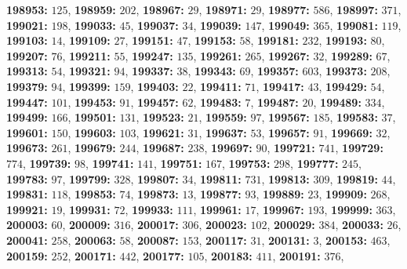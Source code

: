 \textsf{\bfseries 198953:} $125$, \textsf{\bfseries 198959:} $202$, \textsf{\bfseries 198967:} $29$, \textsf{\bfseries 198971:} $29$, \textsf{\bfseries 198977:} $586$, \textsf{\bfseries 198997:} $371$, \textsf{\bfseries 199021:} $198$, \textsf{\bfseries 199033:} $45$, \textsf{\bfseries 199037:} $34$, \textsf{\bfseries 199039:} $147$, \textsf{\bfseries 199049:} $365$, \textsf{\bfseries 199081:} $119$, \textsf{\bfseries 199103:} $14$, \textsf{\bfseries 199109:} $27$, \textsf{\bfseries 199151:} $47$, \textsf{\bfseries 199153:} $58$, \textsf{\bfseries 199181:} $232$, \textsf{\bfseries 199193:} $80$, \textsf{\bfseries 199207:} $76$, \textsf{\bfseries 199211:} $55$, \textsf{\bfseries 199247:} $135$, \textsf{\bfseries 199261:} $265$, \textsf{\bfseries 199267:} $32$, \textsf{\bfseries 199289:} $67$, \textsf{\bfseries 199313:} $54$, \textsf{\bfseries 199321:} $94$, \textsf{\bfseries 199337:} $38$, \textsf{\bfseries 199343:} $69$, \textsf{\bfseries 199357:} $603$, \textsf{\bfseries 199373:} $208$, \textsf{\bfseries 199379:} $94$, \textsf{\bfseries 199399:} $159$, \textsf{\bfseries 199403:} $22$, \textsf{\bfseries 199411:} $71$, \textsf{\bfseries 199417:} $43$, \textsf{\bfseries 199429:} $54$, \textsf{\bfseries 199447:} $101$, \textsf{\bfseries 199453:} $91$, \textsf{\bfseries 199457:} $62$, \textsf{\bfseries 199483:} $7$, \textsf{\bfseries 199487:} $20$, \textsf{\bfseries 199489:} $334$, \textsf{\bfseries 199499:} $166$, \textsf{\bfseries 199501:} $131$, \textsf{\bfseries 199523:} $21$, \textsf{\bfseries 199559:} $97$, \textsf{\bfseries 199567:} $185$, \textsf{\bfseries 199583:} $37$, \textsf{\bfseries 199601:} $150$, \textsf{\bfseries 199603:} $103$, \textsf{\bfseries 199621:} $31$, \textsf{\bfseries 199637:} $53$, \textsf{\bfseries 199657:} $91$, \textsf{\bfseries 199669:} $32$, \textsf{\bfseries 199673:} $261$, \textsf{\bfseries 199679:} $244$, \textsf{\bfseries 199687:} $238$, \textsf{\bfseries 199697:} $90$, \textsf{\bfseries 199721:} $741$, \textsf{\bfseries 199729:} $774$, \textsf{\bfseries 199739:} $98$, \textsf{\bfseries 199741:} $141$, \textsf{\bfseries 199751:} $167$, \textsf{\bfseries 199753:} $298$, \textsf{\bfseries 199777:} $245$, \textsf{\bfseries 199783:} $97$, \textsf{\bfseries 199799:} $328$, \textsf{\bfseries 199807:} $34$, \textsf{\bfseries 199811:} $731$, \textsf{\bfseries 199813:} $309$, \textsf{\bfseries 199819:} $44$, \textsf{\bfseries 199831:} $118$, \textsf{\bfseries 199853:} $74$, \textsf{\bfseries 199873:} $13$, \textsf{\bfseries 199877:} $93$, \textsf{\bfseries 199889:} $23$, \textsf{\bfseries 199909:} $268$, \textsf{\bfseries 199921:} $19$, \textsf{\bfseries 199931:} $72$, \textsf{\bfseries 199933:} $111$, \textsf{\bfseries 199961:} $17$, \textsf{\bfseries 199967:} $193$, \textsf{\bfseries 199999:} $363$, \textsf{\bfseries 200003:} $60$, \textsf{\bfseries 200009:} $316$, \textsf{\bfseries 200017:} $306$, \textsf{\bfseries 200023:} $102$, \textsf{\bfseries 200029:} $384$, \textsf{\bfseries 200033:} $26$, \textsf{\bfseries 200041:} $258$, \textsf{\bfseries 200063:} $58$, \textsf{\bfseries 200087:} $153$, \textsf{\bfseries 200117:} $31$, \textsf{\bfseries 200131:} $3$, \textsf{\bfseries 200153:} $463$, \textsf{\bfseries 200159:} $252$, \textsf{\bfseries 200171:} $442$, \textsf{\bfseries 200177:} $105$, \textsf{\bfseries 200183:} $411$, \textsf{\bfseries 200191:} $376$, 
